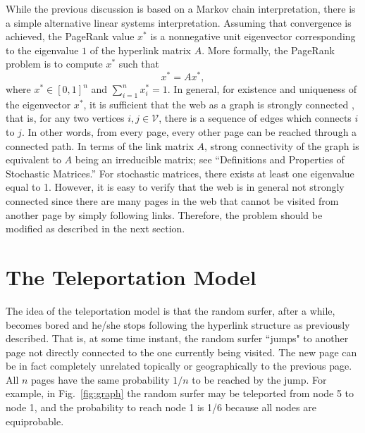 \documentclass[11pt,draftcls,onecolumn]{IEEEtran}
\begin{document}
While the previous discussion is based on a Markov chain interpretation, there is a 
simple alternative linear systems interpretation. Assuming that convergence is achieved, 
the PageRank value $x^*$ is a nonnegative unit eigenvector corresponding to the eigenvalue $1$ 
of the hyperlink matrix $A$. More formally, the PageRank problem is to compute $x^*$ 
such that
\begin{equation}
x^* = A x^*,
\end{equation}
where $x^*\in [0,1]^n$ and $\sum_{i=1}^n x^*_i = 1$. In general, for existence and uniqueness 
of the eigenvector $x^*$,  it is sufficient that the web as a graph is strongly connected
\cite{HorJoh:85}, that is, for any two vertices $i,j\in {\mathcal V}$, there is a sequence of
edges which connects $i$ to $j$. In other words, from every page, 
every other page can be reached through a connected path. 
In terms of the link matrix $A$, strong connectivity 
of the graph is equivalent to $A$ being an irreducible matrix; 
see ``Definitions and Properties of Stochastic Matrices.''
For stochastic matrices, there exists at least one eigenvalue equal to 1. 
However, it is easy to verify that the web is in general not strongly connected
since there are many pages in the web that cannot be visited from another page
by simply following links. Therefore, the problem should be 
modified as described in the next section.


\section*{The Teleportation Model}

The idea of the teleportation model is that the random surfer, after a while, becomes bored and 
he/she stops following the hyperlink structure as previously described. That is, at some time instant, 
the random surfer ``jumps" to another page not directly connected to the one currently being visited. 
The new page can be in fact completely unrelated 
topically or geographically to
the previous page. All $n$ pages have the same probability $1/n$ to be reached 
by the jump. For example, in Fig.~\ref{fig:graph} the random surfer may be teleported from 
node 5 to node 1, and the probability to reach node 1 is 1/6 because all nodes are equiprobable.
\end{document}
